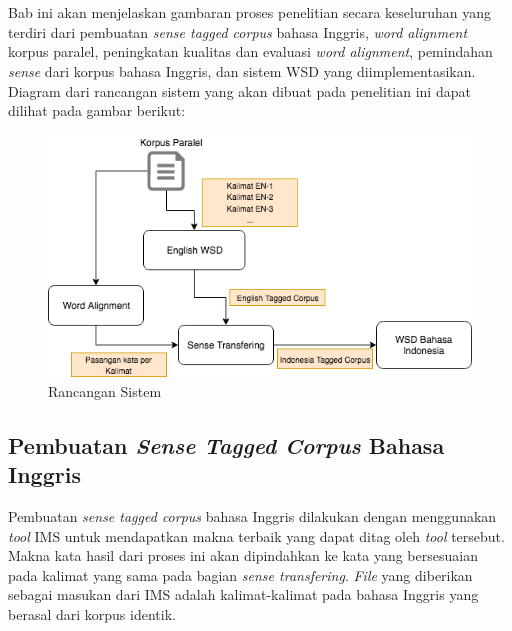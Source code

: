 \chapter{\babTiga}
Bab ini akan menjelaskan gambaran proses penelitian secara keseluruhan yang terdiri dari pembuatan \textit{sense tagged corpus} bahasa Inggris,  \textit{word alignment} korpus paralel, peningkatan kualitas dan evaluasi \textit{word alignment}, pemindahan \textit{sense} dari korpus bahasa Inggris, dan sistem WSD yang diimplementasikan. Diagram dari rancangan sistem yang akan dibuat pada penelitian ini dapat dilihat pada gambar berikut:

\begin{figure}
	\centering
	\includegraphics[width=1\linewidth]{adit_pics/WSD-full}
	\caption{Rancangan Sistem}
	\label{fig:Rancangan-Sistem}
\end{figure}

\section{Pembuatan \textit{Sense Tagged Corpus} Bahasa Inggris}

Pembuatan \textit{sense tagged corpus} bahasa Inggris dilakukan dengan menggunakan \textit{tool} IMS untuk mendapatkan makna terbaik yang dapat ditag oleh \textit{tool} tersebut. Makna kata hasil dari proses ini akan dipindahkan ke kata yang bersesuaian pada kalimat yang sama pada bagian \textit{sense transfering}. \textit{File} yang diberikan sebagai masukan dari IMS adalah kalimat-kalimat pada bahasa Inggris yang berasal dari korpus identik.

